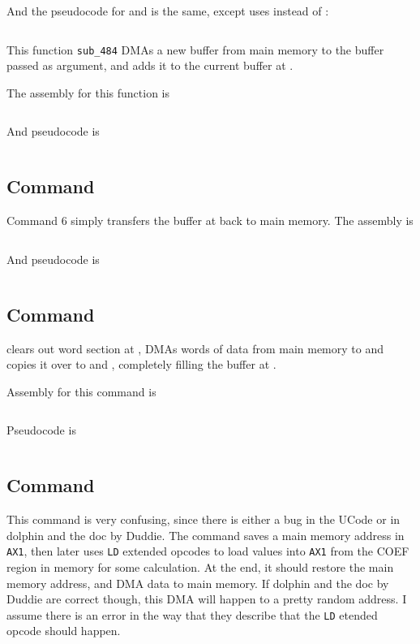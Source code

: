 \inputminted[fontsize=\small]{asm}{../ucode/command_4.asm}

And the pseudocode for  and  is the same, except  uses  instead of :

\inputminted{c}{../ucode/command_459.c}

This function \texttt{sub_484} DMAs a new buffer from main memory to the buffer passed as argument, and adds it to the current buffer at .

The assembly for this function is

\inputminted[fontsize=\small]{asm}{../ucode/mix_buffers.asm}

And pseudocode is

\inputminted{c}{../ucode/mix_buffers.c}

\subsection{Command }
Command 6 simply transfers the buffer at  back to main memory. The assembly is 

\inputminted[fontsize=\small]{asm}{../ucode/command_6.asm}

And pseudocode is

\inputminted{c}{../ucode/command_6.c}

\subsection{Command }
clears out  word section at , DMAs  words of data from main memory to  and copies it over to  and , completely filling the buffer at . 

Assembly for this command is

\inputminted[fontsize=\small]{asm}{../ucode/command_7.asm}

Pseudocode is

\inputminted{c}{../ucode/command_7.c}

\subsection{Command }
This command is very confusing, since there is either a bug in the UCode or in dolphin and the doc by Duddie. The command saves a main memory address in \texttt{AX1}, then later uses \texttt{LD} extended opcodes to load values into \texttt{AX1} from the COEF region in memory for some calculation. At the end, it should restore the main memory address, and DMA data to main memory. If dolphin and the doc by Duddie are correct though, this DMA will happen to a pretty random address. I assume there is an error in the way that they describe that the \texttt{LD} etended opcode should happen.

